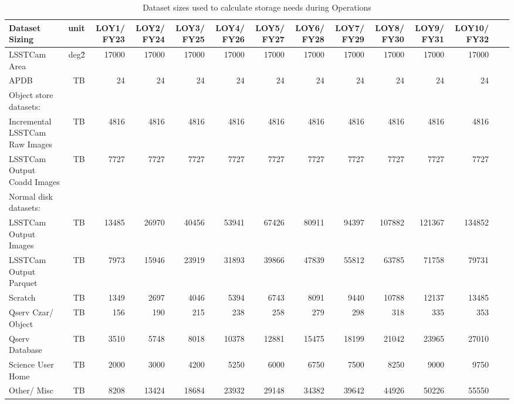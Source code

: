 \tiny \begin{longtable} { |p{}  |r  |r  |r  |r  |r  |r  |r  |r  |r  |r  |r  |r  |r |} 
\caption{Dataset sizes used to calculate storage needs during Operations \label{tab:datasetSizingOps}}\\ 
\hline 
\textbf{Dataset Sizing}&\textbf{unit}&\textbf{LOY1/ FY23}&\textbf{LOY2/ FY24}&\textbf{LOY3/ FY25}&\textbf{LOY4/ FY26}&\textbf{LOY5/ FY27}&\textbf{LOY6/ FY28}&\textbf{LOY7/ FY29}&\textbf{LOY8/ FY30}&\textbf{LOY9/ FY31}&\textbf{LOY10/ FY32}& \\ \hline
{LSSTCam Area}&{deg\^2}&{17000}&{17000}&{17000}&{17000}&{17000}&{17000}&{17000}&{17000}&{17000}&{17000}& \\ \hline
{APDB}&{TB}&{24}&{24}&{24}&{24}&{24}&{24}&{24}&{24}&{24}&{24}& \\ \hline
{Object store datasets:}&&&&&&&&&&&& \\ \hline
{Incremental LSSTCam Raw Images}&{TB}&{4816}&{4816}&{4816}&{4816}&{4816}&{4816}&{4816}&{4816}&{4816}&{4816}& \\ \hline
{LSSTCam Output Coadd Images}&{TB}&{7727}&{7727}&{7727}&{7727}&{7727}&{7727}&{7727}&{7727}&{7727}&{7727}& \\ \hline
{Normal disk datasets:}&&&&&&&&&&&& \\ \hline
{LSSTCam Output Images}&{TB}&{13485}&{26970}&{40456}&{53941}&{67426}&{80911}&{94397}&{107882}&{121367}&{134852}& \\ \hline
{LSSTCam Output Parquet}&{TB}&{7973}&{15946}&{23919}&{31893}&{39866}&{47839}&{55812}&{63785}&{71758}&{79731}& \\ \hline
{Scratch}&{TB}&{1349}&{2697}&{4046}&{5394}&{6743}&{8091}&{9440}&{10788}&{12137}&{13485}& \\ \hline
{Qserv Czar/ Object}&{TB}&{156}&{190}&{215}&{238}&{258}&{279}&{298}&{318}&{335}&{353}& \\ \hline
{Qserv Database}&{TB}&{3510}&{5748}&{8018}&{10378}&{12881}&{15475}&{18199}&{21042}&{23965}&{27010}& \\ \hline
{Science User Home}&{TB}&{2000}&{3000}&{4200}&{5250}&{6000}&{6750}&{7500}&{8250}&{9000}&{9750}& \\ \hline
{Other/ Misc}&{TB}&{8208}&{13424}&{18684}&{23932}&{29148}&{34382}&{39642}&{44926}&{50226}&{55550}& \\ \hline
\end{longtable} \normalsize
